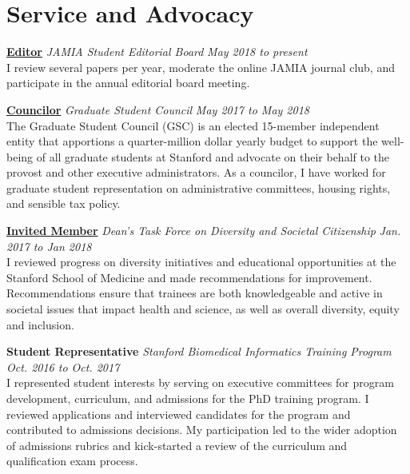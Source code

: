 \section{\mysidestyle Service and Advocacy}

    \href{https://academic.oup.com/jamia/article/11/1/87/855126}
    {\textbf{Editor}}
    \textsl{JAMIA Student Editorial Board}
    \hfill \textsl{May 2018 to present} \\
    {\small I review several papers per year, moderate the online JAMIA journal club, and participate in the annual editorial board meeting.}

    \href{https://associatedstudents.stanford.edu/gsc}
    {\textbf{Councilor}}
    \textsl{Graduate Student Council}
    \hfill \textsl{May 2017 to May 2018} \\
    {\small The Graduate Student Council (GSC) is an elected 15-member independent entity that apportions a quarter-million dollar yearly budget to support the well-being of all graduate students at Stanford and advocate on their behalf to the provost and other executive administrators. As a councilor, I have worked for graduate student representation on administrative committees, housing rights, and sensible tax policy.}

    \href{http://med.stanford.edu/school/leadership/dean/updates/2015/diversity-and-societal-citizenship.html}
    {\textbf{Invited Member}}
    \textsl{Dean's Task Force on Diversity and Societal Citizenship}
    \hfill \textsl{Jan. 2017 to Jan 2018} \\ 
    {\small I reviewed progress on diversity initiatives and educational opportunities at the Stanford School of Medicine and made recommendations for improvement. Recommendations ensure that trainees are both knowledgeable and active in societal issues that impact health and science, as well as overall diversity, equity and inclusion.}
    
    \textbf{Student Representative}
    \textsl{Stanford Biomedical Informatics Training Program}
    \hfill \textsl{Oct. 2016 to Oct. 2017} \\ 
    {\small I represented student interests by serving on executive committees for program development, curriculum, and admissions for the PhD training program. I reviewed applications and interviewed candidates for the program and contributed to admissions decisions. My participation led to the wider adoption of admissions rubrics and kick-started a review of the curriculum and qualification exam process.} 
    

